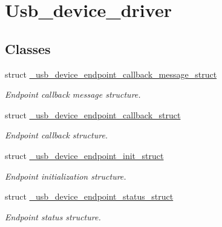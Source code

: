 \hypertarget{group__usb__device__driver}{\section{Usb\-\_\-device\-\_\-driver}
\label{group__usb__device__driver}
}
\subsection*{Classes}
\begin{DoxyCompactItemize}
\item 
struct \hyperlink{struct__usb__device__endpoint__callback__message__struct}{\-\_\-usb\-\_\-device\-\_\-endpoint\-\_\-callback\-\_\-message\-\_\-struct}
\begin{DoxyCompactList}\small\item\em Endpoint callback message structure. \end{DoxyCompactList}\item 
struct \hyperlink{struct__usb__device__endpoint__callback__struct}{\-\_\-usb\-\_\-device\-\_\-endpoint\-\_\-callback\-\_\-struct}
\begin{DoxyCompactList}\small\item\em Endpoint callback structure. \end{DoxyCompactList}\item 
struct \hyperlink{struct__usb__device__endpoint__init__struct}{\-\_\-usb\-\_\-device\-\_\-endpoint\-\_\-init\-\_\-struct}
\begin{DoxyCompactList}\small\item\em Endpoint initialization structure. \end{DoxyCompactList}\item 
struct \hyperlink{struct__usb__device__endpoint__status__struct}{\-\_\-usb\-\_\-device\-\_\-endpoint\-\_\-status\-\_\-struct}
\begin{DoxyCompactList}\small\item\em Endpoint status structure. \end{DoxyCompactList}\end{DoxyCompactItemize}
